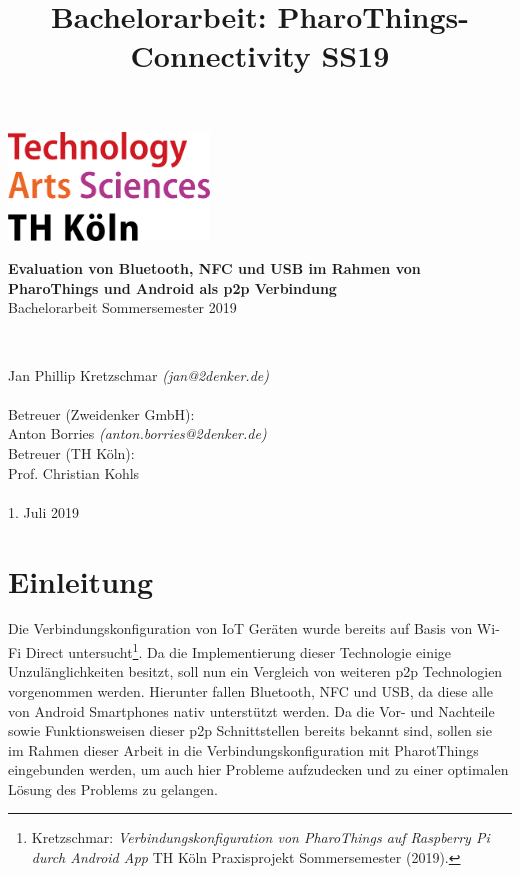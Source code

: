 \documentclass[12pt,a4paper]{article}
\title{Bachelorarbeit: PharoThings-Connectivity SS19}
\begin{document}
	\begin{titlepage}
    \includegraphics[width=0.4\textwidth]{../latex-ai-project/th_logo.png}
    ~\\[2.5cm]
    \begin{center}
    \textbf{\huge Evaluation von Bluetooth, NFC und USB im Rahmen von PharoThings und Android als p2p Verbindung}\\[0.5cm]
    {\Large Bachelorarbeit Sommersemester 2019}
    \vfill
    \end{center}
    ~\\[2.0cm]
    \begin{flushright}
    {\large Jan Phillip Kretzschmar \it{(jan@2denker.de)}}\\[0.1cm]
    ~\\[1.0cm]
    {\large Betreuer (Zweidenker GmbH):}\\[0.1cm]
    {\large Anton Borries \it{(anton.borries@2denker.de)}}
    ~\\[0.5cm]
    {\large Betreuer (TH Köln):}\\[0.1cm]
    {\large Prof. Christian Kohls}\\[0.1cm]

	~\\[1.0cm]
    {\large 1. Juli 2019}
	\end{flushright}
    \end{titlepage}
    \pagebreak
	\tableofcontents
	\pagebreak
	
    \section{Einleitung}
        Die Verbindungskonfiguration von IoT Geräten wurde bereits auf Basis von Wi-Fi Direct untersucht\footnote{Kretzschmar: {\it Verbindungskonfiguration von PharoThings auf Raspberry Pi durch Android App} TH Köln Praxisprojekt Sommersemester (2019).}. Da die Implementierung dieser Technologie einige Unzulänglichkeiten besitzt, soll nun ein Vergleich von weiteren p2p Technologien vorgenommen werden. Hierunter fallen Bluetooth, NFC und USB, da diese alle von Android Smartphones nativ unterstützt werden. Da die Vor- und Nachteile sowie Funktionsweisen dieser p2p Schnittstellen bereits bekannt sind, sollen sie im Rahmen dieser Arbeit in die Verbindungskonfiguration mit PharotThings eingebunden werden, um auch hier Probleme aufzudecken und zu einer optimalen Lösung des Problems zu gelangen.
        
\end{document}
